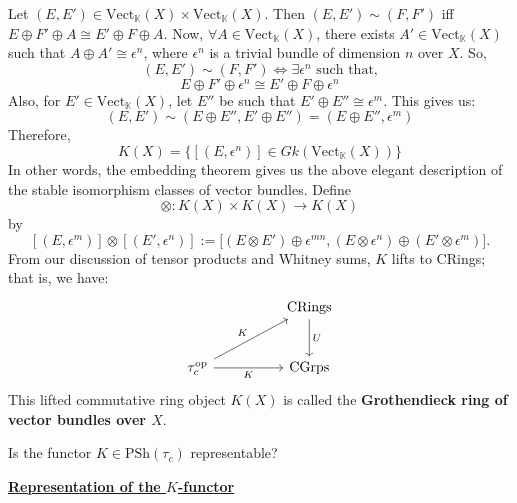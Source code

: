 \documentclass[11pt,a4paper]{article}
\begin{document}
Let $(E, E') \in \text{Vect}_{\mathbb{K}}(X)\times \text{Vect}_{\mathbb{K}}(X)$. Then $(E, E') \sim (F, F')$ iff $E\oplus F'\oplus A \cong E'\oplus F\oplus A$. Now, $\forall A \in \text{Vect}_{\mathbb{K}}(X)$, there exists $A' \in \text{Vect}_{\mathbb{K}}(X)$ such that $A\oplus A' \cong \epsilon^n$, where $\epsilon^n$ is a trivial bundle of dimension $n$ over $X$. So,
$$(E, E') \sim (F,F') \iff \exists \epsilon^n \text{ such that,}$$
$$E\oplus F'\oplus \epsilon^n \cong E'\oplus F\oplus \epsilon^n$$
Also, for $E'\in \text{Vect}_{\mathbb{K}}(X)$, let $E''$ be such that $E'\oplus E'' \cong \epsilon^m$. This gives us:
$$(E, E') \sim (E\oplus E'', E' \oplus E'') = (E\oplus E'', \epsilon^m)$$
Therefore,
$$K(X) = \{[(E, \epsilon^n)] \in Gk(\text{Vect}_{\mathbb{K}}(X))\}$$
In other words, the embedding theorem gives us the above elegant description of the stable isomorphism classes of vector bundles. Define
\[
  \otimes:K(X)\times K(X)\longrightarrow K(X)
\]
by
\[
[(E,\epsilon^m)]\otimes[(E',\epsilon^n)]
:=\bigl[(E\otimes E')\oplus\epsilon^{mn},
        (E\otimes\epsilon^n)\oplus(E'\otimes\epsilon^m)\bigr].
\]
From our discussion of tensor products and Whitney sums, $K$ lifts to CRings; that is, we have:
\[\begin{tikzcd}[column sep=huge,row sep=large]
	& {\text{CRings}} \\
	{\tau_c^{\text{op}}} & {\text{CGrps}}
	\arrow["K"', from=2-1, to=2-2]
	\arrow["U", from=1-2, to=2-2]
	\arrow["K", from=2-1, to=1-2]
\end{tikzcd}\]
This lifted commutative ring object $K(X)$ is called the \textbf{Grothendieck ring of vector bundles over $X$}.

\begin{question}
Is the functor $K\in \text{PSh}(\tau_c)$ representable?
\end{question}

\underline{\textbf{Representation of the $K$-functor}}
\end{document}
